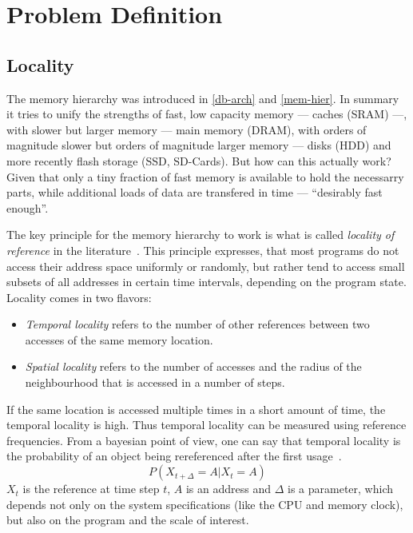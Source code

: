 \chapter{Problem Definition}\label{\positionnumber}
\section{Locality}\label{\positionnumber}
    The memory hierarchy was introduced in \ref{db-arch} and \ref{mem-hier}. 
    In summary it tries to unify the strengths of fast, low capacity memory --- caches (SRAM) ---, with slower but larger memory --- main memory (DRAM), with orders of magnitude slower but orders of magnitude larger memory --- disks (HDD) and more recently flash storage (SSD, SD-Cards).
    But how can this actually work? 
    Given that only a tiny fraction of fast memory is available to hold the necessarry parts, while additional loads of data are transfered in time --- ``desirably fast enough''.
    
    The key principle for the memory hierarchy to work is what is called \textit{locality of reference} in the literature~\autocite{jacob2010memory, tanenbaum2015modern}. 
    This principle expresses, that most programs do not access their address space uniformly or randomly, but rather tend to access small subsets of all addresses in certain time intervals, depending on the program state.
    Locality comes in two flavors: 
    
    \begin{itemize}
     \item \textit{Temporal locality} refers to the number of other references between two accesses of the same memory location. 
     \item \textit{Spatial locality} refers to the number of accesses and the radius of the neighbourhood that is accessed in a number of steps.
    \end{itemize}
    
    If the same location is accessed multiple times in a short amount of time, the temporal locality is high.
    Thus temporal locality can be measured using reference frequencies.
    From a bayesian point of view, one can say that temporal locality is the probability of an object being rereferenced after the first usage~\autocite{gupta2013locality}. 
    \[ P (X_{t + \Delta} = A | X_t = A) \]
    $X_t$ is the reference at time step $t$, $A$ is an address and $\Delta$ is a parameter, which depends not only on the system specifications (like the CPU and memory clock), but also on the program and the scale of interest.
    
